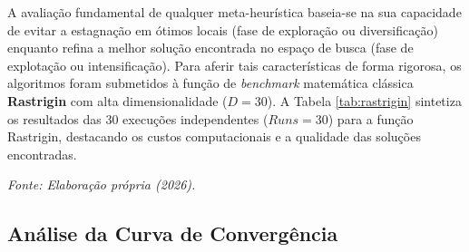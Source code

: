 \documentclass[12pt, a4paper, oneside]{report}
\begin{document}
A avaliação fundamental de qualquer meta-heurística baseia-se na sua capacidade de evitar a estagnação em ótimos locais (fase de exploração ou diversificação) enquanto refina a melhor solução encontrada no espaço de busca (fase de explotação ou intensificação). Para aferir tais características de forma rigorosa, os algoritmos foram submetidos à função de \textit{benchmark} matemática clássica \textbf{Rastrigin} com alta dimensionalidade ($D=30$). A Tabela \ref{tab:rastrigin} sintetiza os resultados das 30 execuções independentes ($Runs=30$) para a função Rastrigin, destacando os custos computacionais e a qualidade das soluções encontradas.

\begin{table}[H]
    \centering
    \caption{Desempenho dos algoritmos na Função de Benchmark Rastrigin ($D=30$, $Iter=500$, $Runs=30$).}
    \vspace{0.2cm}
    \label{tab:rastrigin}
    \par\vspace{0.2cm}
    \centerline{\small \textit{Fonte: Elaboração própria (2026).}}
\end{table}

\subsection{Análise da Curva de Convergência}
\end{document}

